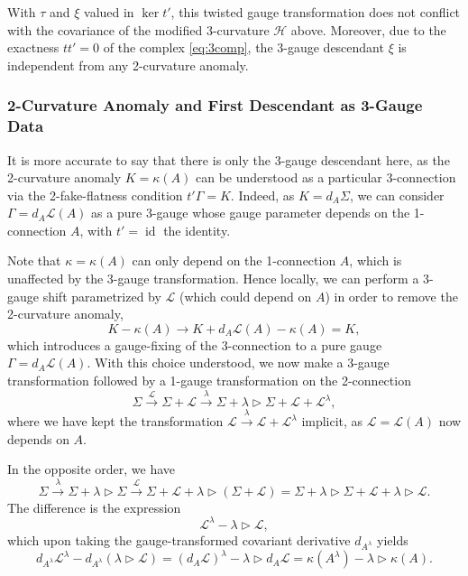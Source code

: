 \documentclass[onecolumn]{article}
\theoremstyle{theorem}
\theoremstyle{remark}
\theoremstyle{example}
\theoremstyle{definition}
\numberwithin{equation}{section}
\begin{document}
With $\tau$ and $\xi$ valued in $\operatorname{ker}t'$, this twisted gauge transformation does not conflict with the covariance of the modified 3-curvature $\mathcal{H}$ above. Moreover, due to the exactness $tt'=0$ of the complex  \eqref{eq:3comp}, the 3-gauge descendant $\xi$ is { {independent}} from any 2-curvature anomaly.



\subsubsection{2-Curvature Anomaly and First Descendant as 3-Gauge Data}\label{2curvanomal}

It is more accurate to say that { {there is only the 3-gauge descendant}} here, as the 2-curvature anomaly $K=\kappa(A)$ can be understood as a particular 3-connection via the 2-fake-flatness condition $t'\Gamma=K$. Indeed, as $K=d_A\Sigma$, we can consider $\Gamma = d_A\mathcal{L}(A)$ as a pure 3-gauge whose gauge parameter depends on the 1-connection $A$, with $t'=\operatorname{id}$ the identity. 

Note that $\kappa=\kappa(A)$ can only depend on the 1-connection $A$, which is unaffected by the 3-gauge transformation. Hence locally, we can perform a 3-gauge shift parametrized by $\mathcal{L}$ (which could depend on $A$) in order to remove the 2-curvature anomaly,
\begin{equation}
    K-\kappa(A) \rightarrow K + d_A\mathcal{L}(A) -\kappa(A) = K,\nonumber
\end{equation}
which introduces a gauge-fixing of the 3-connection to a pure gauge $\Gamma=d_A\mathcal{L}(A)$. With this choice understood, we now make a 3-gauge transformation followed by a 1-gauge transformation on the 2-connection
\begin{equation}
    \Sigma\xrightarrow{\mathcal{L}} \Sigma+\mathcal{L}\xrightarrow{\lambda} \Sigma+\lambda\rhd \Sigma+ \mathcal{L}+\mathcal{L}^\lambda,\nonumber
\end{equation}
where we have kept the transformation $\mathcal{L}\xrightarrow{\lambda}\mathcal{L}+\mathcal{L}^\lambda$ implicit, as $\mathcal{L}=\mathcal{L}(A)$ now depends on $A$. 

In the opposite order, we have
\begin{equation}
    \Sigma\xrightarrow{\lambda} \Sigma+\lambda\rhd \Sigma\xrightarrow{\mathcal{L}} \Sigma + \mathcal{L} + \lambda\rhd(\Sigma+\mathcal{L}) = \Sigma + \lambda\rhd \Sigma + \mathcal{L} + \lambda\rhd \mathcal{L}.\nonumber
\end{equation}
{The} difference is the expression
\begin{equation}
    \mathcal{L}^\lambda - \lambda\rhd\mathcal{L},\nonumber
\end{equation}
which upon taking the gauge-transformed covariant derivative $d_{A^\lambda}$ yields
\begin{equation}
    d_{A^\lambda}\mathcal{L}^\lambda - d_{A^\lambda}(\lambda\rhd \mathcal{L}) = (d_A\mathcal{L})^\lambda - \lambda\rhd d_A\mathcal{L} = \kappa(A^\lambda)-\lambda\rhd \kappa(A).\nonumber
\end{equation}
\end{document}
